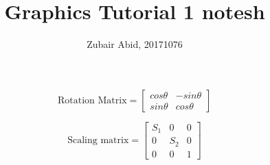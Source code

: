 \documentclass[a4paper, 12pt]{article}
\title{Graphics Tutorial 1 notesh}
\author{Zubair Abid, 20171076}
\begin{document}
\maketitle





	\[
	\textrm{Rotation Matrix} = 
		\begin{bmatrix}
			cos \theta & - sin \theta \\
			sin \theta & cos \theta
		\end{bmatrix}			
	\]
	
	\[
	\textrm{Scaling matrix} = 
		\begin{bmatrix}
			S_1 & 0 & 0 \\
			0 & S_2 & 0 \\
			0 & 0 & 1		
		\end{bmatrix}			
	\]
\end{document}
